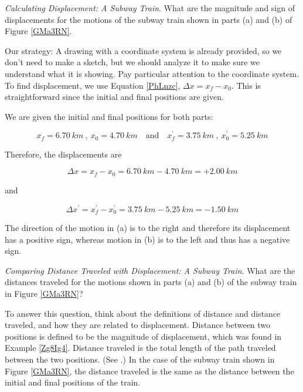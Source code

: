 \documentclass[main-ap-physics.tex]{subfiles}
\begin{document}
\begin{example} \label{Zg8Ig4}
    \textit{Calculating Displacement: A Subway Train}. What are the magnitude and sign of displacements for the motions of the subway train shown in parts (a) and (b) of Figure \ref{GMa3RN}.
\end{example}

\Solution Our strategy: A drawing with a coordinate system is already provided, so we don't need to make a sketch, but we should analyze it to make sure we understand what it is showing. Pay particular attention to the coordinate system. To find displacement, we use Equation \eqref{PhLnzc}, $\Delta{x} = x_f - x_0$. This is straightforward since the initial and final positions are given.

\vspace{1em}

We are given the initial and final positions for both parts:

\begin{equation*}
    x_f = \SI{6.70}{km}\ ,\ x_0=\SI{4.70}{km} \quad
    \text{and} \quad
    x_f^{\prime}=\SI{3.75}{km}\ ,\ x_0^{\prime} = \SI{5.25}{km}
\end{equation*}

Therefore, the displacements are

\begin{equation*}
    \Delta x = x_f - x_0 = \SI{6.70}{km} - \SI{4.70}{km} = +\SI{2.00}{km}
\end{equation*}

and

\begin{equation*}
    \Delta x^{\prime} = x_f^{\prime} - x_0^{\prime} = \SI{3.75}{km} - \SI{5.25}{km} = -\SI{1.50}{km}
\end{equation*}

The direction of the motion in (a) is to the right and therefore its displacement has a positive sign, whereas motion in (b) is to the left and thus has a negative sign.

\endsolution

\begin{example}
    \textit{Comparing Distance Traveled with Displacement: A Subway Train}. What are the distances traveled for the motions shown in parts (a) and (b) of the subway train in Figure \ref{GMa3RN}?
\end{example}

\Solution To answer this question, think about the definitions of distance and distance traveled, and how they are related to displacement. Distance between two positions is defined to be the magnitude of displacement, which was found in Example \ref{Zg8Ig4}. Distance traveled is the total length of the path traveled between the two positions. (See .) In the case of the subway train shown in Figure \ref{GMa3RN}, the distance traveled is the same as the distance between the initial and final positions of the train.
\end{document}
